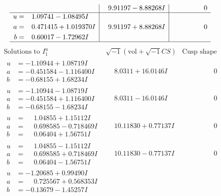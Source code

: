 \documentclass[1p]{elsarticle_modified}
\theoremstyle{definition}
\newcommand{\I}{\sqrt{-1}}
\begin{document}
$$\begin{array}{c|c|c}
 & \phantom{-}9.91197 - 8.88268 I & \phantom{-0.000000 } 0 \\ \hline\begin{aligned}
u &= \phantom{-}1.09741 - 1.08495 I \\
a &= \phantom{-}0.471415 + 1.019370 I \\
b &= \phantom{-}0.60017 - 1.72962 I\end{aligned}
 & \phantom{-}9.91197 + 8.88268 I & \phantom{-0.000000 } 0\\
 \hline 
 \end{array}$$\newpage$$\begin{array}{c|c|c}  
\text{Solutions to }I^u_{1}& \I (\text{vol} + \sqrt{-1}CS) & \text{Cusp shape}\\
 \hline 
\begin{aligned}
u &= -1.10944 + 1.08719 I \\
a &= -0.451584 - 1.116400 I \\
b &= -0.68155 + 1.68234 I\end{aligned}
 & \phantom{-}8.0311 + 16.0146 I & \phantom{-0.000000 } 0 \\ \hline\begin{aligned}
u &= -1.10944 - 1.08719 I \\
a &= -0.451584 + 1.116400 I \\
b &= -0.68155 - 1.68234 I\end{aligned}
 & \phantom{-}8.0311 - 16.0146 I & \phantom{-0.000000 } 0 \\ \hline\begin{aligned}
u &= \phantom{-}1.04855 + 1.15112 I \\
a &= \phantom{-}0.698585 - 0.718469 I \\
b &= \phantom{-}0.06404 + 1.56751 I\end{aligned}
 & \phantom{-}10.11830 + 0.77137 I & \phantom{-0.000000 } 0 \\ \hline\begin{aligned}
u &= \phantom{-}1.04855 - 1.15112 I \\
a &= \phantom{-}0.698585 + 0.718469 I \\
b &= \phantom{-}0.06404 - 1.56751 I\end{aligned}
 & \phantom{-}10.11830 - 0.77137 I & \phantom{-0.000000 } 0 \\ \hline\begin{aligned}
u &= -1.20685 + 0.99490 I \\
a &= \phantom{-}0.725567 + 0.568353 I \\
b &= -0.13679 - 1.45257 I\end{aligned}

\end{array}$$
\end{document}
